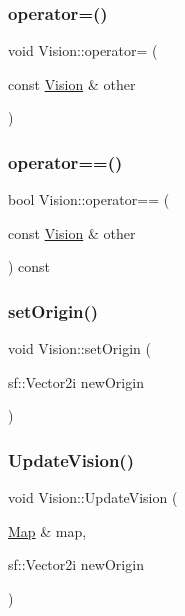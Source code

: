 \mbox{\label{class_vision_af3121eb4237a45afbcd98ca28f777e17}} 
\subsubsection{\texorpdfstring{operator=()}{operator=()}}
{\footnotesize\ttfamily void Vision\+::operator= (\begin{DoxyParamCaption}\item[{const \mbox{\hyperlink{class_vision}{Vision}} \&}]{other }\end{DoxyParamCaption})}

\mbox{\label{class_vision_a430c5fbcf645a99efe52a0b820c77e2e}} 
\subsubsection{\texorpdfstring{operator==()}{operator==()}}
{\footnotesize\ttfamily bool Vision\+::operator== (\begin{DoxyParamCaption}\item[{const \mbox{\hyperlink{class_vision}{Vision}} \&}]{other }\end{DoxyParamCaption}) const}

\mbox{\label{class_vision_a5f26ef8f946b7cf29e533797bf474954}} 
\subsubsection{\texorpdfstring{set\+Origin()}{setOrigin()}}
{\footnotesize\ttfamily void Vision\+::set\+Origin (\begin{DoxyParamCaption}\item[{sf\+::\+Vector2i}]{new\+Origin }\end{DoxyParamCaption})}

\mbox{\label{class_vision_a626452b58aa651ff91e4e60a74ce7443}} 
\subsubsection{\texorpdfstring{Update\+Vision()}{UpdateVision()}}
{\footnotesize\ttfamily void Vision\+::\+Update\+Vision (\begin{DoxyParamCaption}\item[{\mbox{\hyperlink{class_map}{Map}} \&}]{map,  }\item[{sf\+::\+Vector2i}]{new\+Origin }\end{DoxyParamCaption})}

